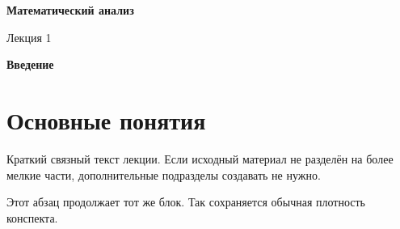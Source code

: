 \documentclass[a4paper,12pt]{article}
\begin{document}
\begin{center}
    {\Large\bfseries Математический анализ}

    \vspace{0.3em}

    {\large Лекция 1}

    \vspace{0.3em}

    \textbf{Введение}
\end{center}

\vspace{1em}

\section{Основные понятия}

Краткий связный текст лекции. Если исходный материал не разделён на более
мелкие части, дополнительные подразделы создавать не нужно.

Этот абзац продолжает тот же блок. Так сохраняется обычная плотность
конспекта.
\end{document}
